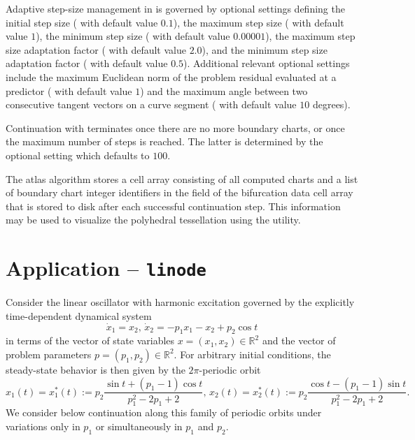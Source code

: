 Adaptive step-size management in  is governed by optional settings defining the initial step size ( with default value $0.1$), the maximum step size ( with default value $1$), the minimum step size ( with default value $0.00001$), the maximum step size adaptation factor ( with default value $2.0$), and the minimum step size adaptation factor ( with default value $0.5$). Additional relevant optional settings include the maximum Euclidean norm of the problem residual evaluated at a predictor ( with default value $1$) and the maximum angle between two consecutive tangent vectors on a curve segment ( with default value $10$ degrees).

Continuation with  terminates once there are no more boundary charts, or once the maximum number of steps is reached. The latter is determined by the optional setting  which defaults to $100$.

The  atlas algorithm stores a cell array consisting of all computed charts and a list of boundary chart integer identifiers in the  field of the bifurcation data cell array that is stored to disk after each successful continuation step. This information may be used to visualize the polyhedral tessellation using the  utility.

\section{Application  -- \texttt{linode}}

Consider the linear oscillator with harmonic excitation governed by the explicitly time-dependent dynamical system
\begin{equation}
\dot{x}_1=x_2,\,\dot{x}_2=-p_1x_1-x_2+p_2\cos t
\end{equation}
in terms of the vector of state variables $x=\left(x_1,x_2\right)\in\mathbb{R}^2$ and the vector of problem parameters $p=\left(p_1,p_2\right)\in\mathbb{R}^2$. For arbitrary initial conditions, the steady-state behavior is then given by the $2\pi$-periodic orbit
\begin{equation}
x_1(t)=x_1^\ast(t):=p_2\frac{\sin t+(p_1-1)\cos t}{p_1^2-2p_1+2},\,x_2(t)=x_2^\ast(t):=p_2\frac{\cos t-(p_1-1)\sin t}{p_1^2-2p_1+2}.
\end{equation}
We consider below continuation along this family of periodic orbits under variations only in $p_1$ or simultaneously in $p_1$ and $p_2$. 


